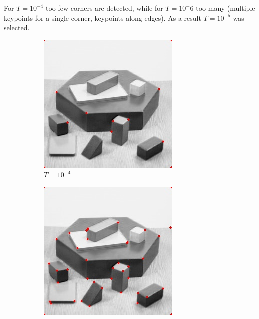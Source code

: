 \documentclass[10pt,a4paper,twoside]{article}
\newcommand{\sweepsize}{0.26}
\begin{document}
For $T=10^{-4}$ too few corners are detected, while for $T=10^-6$ too many (multiple keypoints for a single corner, keypoints along edges). As a result $T=10^{-5}$ was selected. 
\begin{figure}[h]
    \centering

    \begin{subfigure}{\sweepsize\textwidth}
    \includegraphics[width=0.9\linewidth, height=0.9\linewidth]{sweep_blocks/blocks_10_005_00001.jpg} 
    \caption{$T=10^{-4}$}
    \end{subfigure}
    \begin{subfigure}{\sweepsize\textwidth}
    \includegraphics[width=0.9\linewidth, height=0.9\linewidth]{sweep_blocks/blocks_10_005_1e-05.jpg} 

\end{subfigure}
\end{figure}
\end{document}

